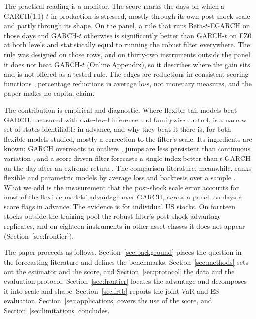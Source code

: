 \documentclass[11pt]{article}
\theoremstyle{remark}
\begin{document}
The practical reading is a monitor. The score marks the days on which a GARCH(1,1)-$t$ in production is stressed, mostly through its own post-shock scale and partly through its shape. On the panel, a rule that runs Beta-$t$-EGARCH on those days and GARCH-$t$ otherwise is significantly better than GARCH-$t$ on FZ0 at both levels and statistically equal to running the robust filter everywhere. The rule was designed on those rows, and on thirty-two instruments outside the panel it does not beat GARCH-$t$ (Online Appendix), so it describes where the gain sits and is not offered as a tested rule. The edges are reductions in consistent scoring functions \citep{gneiting2011}, percentage reductions in average loss, not monetary measures, and the paper makes no capital claim.

The contribution is empirical and diagnostic. Where flexible tail models beat GARCH, measured with date-level inference and familywise control, is a narrow set of states identifiable in advance, and why they beat it there is, for both flexible models studied, mostly a correction to the filter's scale. Its ingredients are known: GARCH overreacts to outliers \citep{carnero2007outliers}, jumps are less persistent than continuous variation \citep{andersen2007roughing}, and a score-driven filter forecasts a single index better than $t$-GARCH on the day after an extreme return \citep{blazsek2018extreme}. The comparison literature, meanwhile, ranks flexible and parametric models by average loss and backtests over a sample \citep{kuester2006, nietoruiz2016}. What we add is the measurement that the post-shock scale error accounts for most of the flexible models' advantage over GARCH, across a panel, on days a score flags in advance. The evidence is for individual US stocks. On fourteen stocks outside the training pool the robust filter's post-shock advantage replicates, and on eighteen instruments in other asset classes it does not appear (Section~\ref{sec:frontier}).

\medskip\noindent The paper proceeds as follows.
Section~\ref{sec:background} places the question in the forecasting literature and defines the benchmarks. Section~\ref{sec:methods} sets out the estimator and the score, and Section~\ref{sec:protocol} the data and the evaluation protocol. Section~\ref{sec:frontier} locates the advantage and decomposes it into scale and shape. Section~\ref{sec:frtb} reports the joint VaR and ES evaluation. Section~\ref{sec:applications} covers the use of the score, and Section~\ref{sec:limitations} concludes.
\end{document}

